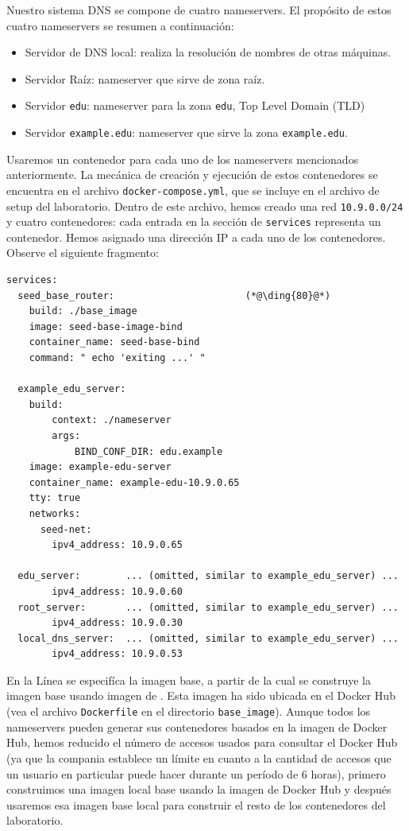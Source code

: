 Nuestro sistema DNS se compone de cuatro nameservers.
El propósito de estos cuatro nameservers se resumen a continuación:

\begin{itemize}[nosep]
\item Servidor de DNS local: realiza la resolución de nombres de otras máquinas.
\item Servidor Raíz: nameserver que sirve de zona raíz.
\item Servidor \texttt{edu}: nameserver para la zona \texttt{edu}, Top Level Domain (TLD)
\item Servidor \texttt{example.edu}: nameserver que sirve la zona \texttt{example.edu}. 
\end{itemize}

Usaremos un contenedor para cada uno de los nameservers mencionados anteriormente.
La mecánica de creación y ejecución de estos contenedores se encuentra en el archivo \texttt{docker-compose.yml}, que se incluye en el archivo de setup del laboratorio. Dentro de este archivo, hemos creado una red \texttt{10.9.0.0/24} y cuatro contenedores: cada entrada en la sección de \texttt{services} representa un contenedor. Hemos asignado una dirección IP a cada uno de los contenedores.
Observe el siguiente fragmento:


\begin{lstlisting}
services:
  seed_base_router:                       (*@\ding{80}@*)
    build: ./base_image
    image: seed-base-image-bind
    container_name: seed-base-bind
    command: " echo 'exiting ...' "

  example_edu_server:
    build:
        context: ./nameserver
        args:
            BIND_CONF_DIR: edu.example
    image: example-edu-server
    container_name: example-edu-10.9.0.65
    tty: true
    networks:
      seed-net:
        ipv4_address: 10.9.0.65

  edu_server:        ... (omitted, similar to example_edu_server) ...
        ipv4_address: 10.9.0.60
  root_server:       ... (omitted, similar to example_edu_server) ...
        ipv4_address: 10.9.0.30
  local_dns_server:  ... (omitted, similar to example_edu_server) ...
        ipv4_address: 10.9.0.53
\end{lstlisting}

En la Línea  se especifíca la imagen base, a partir de la cual se construye la imagen base usando imagen de .
Esta imagen ha sido ubicada en el Docker Hub (vea el archivo \texttt{Dockerfile} en el directorio \texttt{base\_image}).
Aunque todos los nameservers pueden generar sus contenedores basados en la imagen de Docker Hub, hemos reducido el número de accesos usados para consultar el Docker Hub (ya que la compania establece un límite en cuanto a la cantidad de accesos que un usuario en particular puede hacer durante un período de 6 horas), primero construimos una imagen local base usando la imagen de Docker Hub y después usaremos esa imagen base local para construir el resto de los contenedores del laboratorio.

